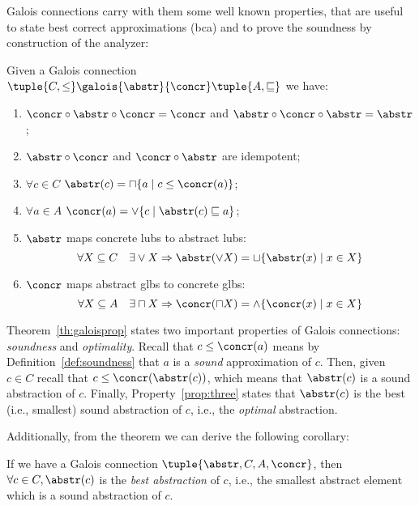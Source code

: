 Galois connections carry with them some well known properties, that
are useful to state best correct approximations (bca) and to prove the
soundness by construction of the analyzer:

\begin{theorem}\label{th:galoisprop}
  Given a Galois connection
  \(\tuple{C,\leq} \galois{\abstr}{\concr} \tuple{A, \sqsubseteq}\) we
  have:
  \begin{enumerate}
  \item \(\concr \circ \abstr \circ \concr = \concr\) and
    \(\abstr \circ \concr \circ \abstr = \abstr\);
  \item \(\abstr \circ \concr\) and \(\concr \circ \abstr\) are
    idempotent;
  \item\label{prop:three} \(\forall c \in C\)
    \(\abstr(c) = \sqcap \{a \mid c \leq \concr(a)\}\);
  \item \(\forall a \in A\)
    \(\concr(a) = \vee \{ c \mid \abstr(c) \sqsubseteq a \}\);
  \item\label{prop:five} \(\abstr\) maps concrete lubs to abstract lubs:
    \begin{equation*}
      \forall X \subseteq C \quad \exists \vee X \Rightarrow \abstr(\vee X) = \sqcup \{\abstr(x) \mid x \in X\}
    \end{equation*}
  \item \(\concr\) maps abstract glbs to concrete glbs:
    \begin{equation*}
      \forall X \subseteq A \quad \exists \sqcap X \Rightarrow \concr(\sqcap X) = \wedge \{\concr(x) \mid x \in X\}
    \end{equation*}
  \end{enumerate}
\end{theorem}

Theorem~\ref{th:galoisprop} states two important properties of Galois
connections: \emph{soundness} and \emph{optimality}. Recall that
\(c \leq \concr(a)\) means by Definition~\ref{def:soundness} that
\(a\) is a \emph{sound} approximation of \(c\). Then, given
\(c \in C\) recall that \(c \leq \concr(\abstr(c))\), which means that
\(\abstr(c)\) is a sound abstraction of \(c\). Finally,
Property~\ref{prop:three} states that \(\abstr(c)\) is the best (i.e.,
smallest) sound abstraction of \(c\), i.e., the \emph{optimal}
abstraction.

Additionally, from the theorem we can derive the
following corollary:

\begin{corollary}\label{co:bestabstr}
  If we have a Galois connection \(\tuple{\abstr, C, A, \concr}\),
  then \(\forall c \in C, \abstr(c)\) is the \emph{best abstraction}
  of \(c\), i.e., the smallest abstract element which is a sound
  abstraction of \(c\).
\end{corollary}

